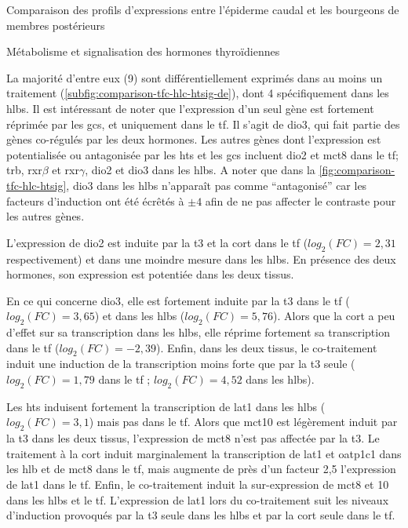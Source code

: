 \documentclass[../main.tex]{subfiles}
\begin{document}
\begin{chapter}{Comparaison des profils d'expressions entre l'épiderme caudal et les bourgeons de membres postérieurs}
\begin{section}{Métabolisme et signalisation des hormones thyroïdiennes}


La majorité d'entre eux (9) sont différentiellement exprimés dans au moins un traitement (\autoref{subfig:comparison-tfc-hlc-htsig-de}), dont 4 spécifiquement dans les \glspl{hlb}.
Il est intéressant de noter que l'expression d'un seul gène est fortement réprimée par les \glspl{gc}, et uniquement dans le \gls{tf}.
Il s'agit de \gls{dio3}, qui fait partie des gènes co-régulés par les deux hormones.
Les autres gènes dont l'expression est potentialisée ou antagonisée par les \glspl{ht} et les \glspl{gc} incluent \gls{dio2} et \gls{mct}8 dans le \gls{tf}; \gls{trb}, \gls{rxr}$\beta$ et \gls{rxr}$\gamma$, \gls{dio2} et \gls{dio3} dans les \glspl{hlb}.
A noter que dans la \autoref{fig:comparison-tfc-hlc-htsig}, \gls{dio3} dans les \glspl{hlb} n’apparaît pas comme ``antagonisé'' car les facteurs d'induction ont été écrêtés à $\pm 4$ afin de ne pas affecter le contraste pour les autres gènes.
\par
L'expression de \gls{dio2} est induite par la \gls{t3} et la \gls{cort} dans le \gls{tf} ($log_2(FC)=2,31$ respectivement) et dans une moindre mesure dans les \glspl{hlb}.
En présence des deux hormones, son expression est potentiée dans les deux tissus.
\par
En ce qui concerne \gls{dio3}, elle est fortement induite par la \gls{t3} dans le \gls{tf} ($log_2(FC)=3,65$) et dans les \glspl{hlb} ($log_2(FC)=5,76$).
Alors que la \gls{cort} a peu d'effet sur sa transcription dans les \glspl{hlb}, elle réprime fortement sa transcription dans le \gls{tf} ($log_2(FC)=-2,39$).
Enfin, dans les deux tissus, le co-traitement induit une induction de la transcription moins forte que par la \gls{t3} seule ($log_2(FC)=1,79$ dans le \gls{tf} ; $log_2(FC)=4,52$ dans les \glspl{hlb}).
\par
Les \glspl{ht} induisent fortement la transcription de \gls{lat}1 dans les \glspl{hlb} ($log_2(FC)=3,1$) mais pas dans le \gls{tf}.
Alors que \gls{mct}10 est légèrement induit par la \gls{t3} dans les deux tissus, l'expression de \gls{mct}8 n'est pas affectée par la \gls{t3}.
Le traitement à la \gls{cort} induit marginalement la transcription de \gls{lat}1 et \gls{oatp}1c1 dans les \gls{hlb} et de \gls{mct}8 dans le \gls{tf}, mais augmente de près d'un facteur 2,5 l'expression de \gls{lat}1 dans le \gls{tf}.
Enfin, le co-traitement induit la sur-expression de \gls{mct}8 et 10 dans les \glspl{hlb} et le \gls{tf}.
L'expression de \gls{lat}1 lors du co-traitement suit les niveaux d'induction provoqués par la \gls{t3} seule dans les \glspl{hlb} et par la \gls{cort} seule dans le \gls{tf}.

\end{section}

\end{chapter}
\end{document}
